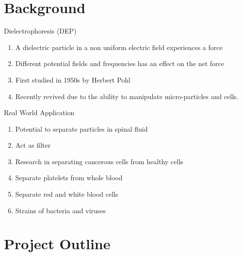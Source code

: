 
\subtitle{for Particle Separation in a Fluid}

\date{27 April 2016}




\begin{frame}
  \maketitle
\end{frame}

\section{Background}

\begin{frame}{Dielectrophoresis (DEP)}
  \begin{enumerate}
  \item A dielectric particle in a non uniform 
  electric field experiences a force
  \item Different potential fields and frequencies 
  has an effect on the net force
  \item First studied in 1950s by Herbert Pohl
  \item Recently revived due to the ability to
  manipulate micro-particles and cells. 
  \end{enumerate}
\end{frame}

\begin{frame}{Real World Application}
  \begin{enumerate}
    \item Potential to separate particles in spinal fluid
    \item Act as filter
    \item Research in separating cancerous cells from healthy cells
    \item Separate platelets from whole blood
    \item Separate red and white blood cells
    \item Strains of bacteria and viruses
  \end{enumerate}
\end{frame}

\section{Project Outline}

